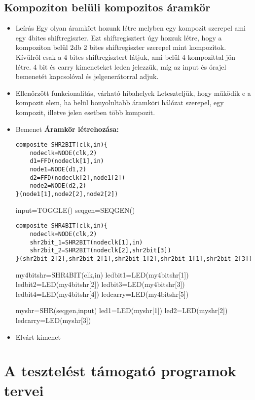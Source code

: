 \subsection{Kompoziton belüli kompozitos áramkör}
\begin{itemize}
\item Leírás\newline
Egy olyan áramkört hozunk létre melyben egy kompozit szerepel ami egy 4bites shiftregiszter. Ezt shiftregisztert úgy hozzuk létre, hogy a kompoziton belül 2db 2 bites shiftregiszter szerepel mint kompozitok. Kívülről csak a 4 bites shiftregisztert látjuk, ami belül 4 kompozittal jön létre. 4 bit és carry kimeneteket leden jelezzük, míg az input és órajel bemenetét kapcsolóval és jelgenerátorral adjuk.
\item Ellenőrzött funkcionalitás, várható hibahelyek\newline
Leteszteljük, hogy működik e a kompozit elem, ha belül bonyolultabb áramköri hálózat szerepel, egy kompozit, illetve jelen esetben több kompozit.
\item Bemenet\newline
\newline
{\bf Áramkör létrehozása:}\newline
\begin{verbatim}
composite SHR2BIT(clk,in){		
    nodeclk=NODE(clk,2)		
    d1=FFD(nodeclk[1],in)		
    node1=NODE(d1,2)			
    d2=FFD(nodeclk[2],node1[2])
    node2=NODE(d2,2)			
}(node1[1],node2[2],node2[2])	
\end{verbatim}

input=TOGGLE() \newline
seqgen=SEQGEN()

\begin{verbatim}
composite SHR4BIT(clk,in){		
    nodeclk=NODE(clk,2)		
    shr2bit_1=SHR2BIT(nodeclk[1],in)
    shr2bit_2=SHR2BIT(nodeclk[2],shr2bit[3])			
}(shr2bit_2[2],shr2bit_2[1],shr2bit_1[2],shr2bit_1[1],shr2bit_2[3])	
\end{verbatim}

my4bitshr=SHR4BIT(clk,in)\newline
ledbit1=LED(my4bitshr[1])\newline
ledbit2=LED(my4bitshr[2])\newline
ledbit3=LED(my4bitshr[3])\newline
ledbit4=LED(my4bitshr[4])\newline
ledcarry=LED(my4bitshr[5])\newline

myshr=SHR(seqgen,input)\newline
led1=LED(myshr[1])\newline
led2=LED(myshr[2])\newline
ledcarry=LED(myshr[3])\newline


\item Elvárt kimenet\newline
{}
\end{itemize}

\section{A tesztelést támogató programok tervei}

